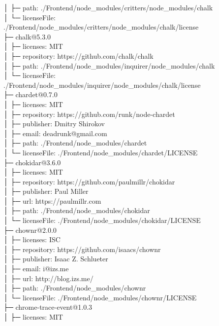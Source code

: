 \documentclass[
    paper=a4,
    twoside=false,
    parskip=half,
    listof=entryprefix,
    listof=totoc,
    index=totoc,
    bibliography=totoc,
    headsepline,
]{scrbook}
\begin{document}
    │  ├─ path: ./Frontend/node\_modules/critters/node\_modules/chalk\\
    │  └─ licenseFile: ./Frontend/node\_modules/critters/node\_modules/chalk/license\\
    ├─ chalk@5.3.0\\
    │  ├─ licenses: MIT\\
    │  ├─ repository: https://github.com/chalk/chalk\\
    │  ├─ path: ./Frontend/node\_modules/inquirer/node\_modules/chalk\\
    │  └─ licenseFile: ./Frontend/node\_modules/inquirer/node\_modules/chalk/license\\
    ├─ chardet@0.7.0\\
    │  ├─ licenses: MIT\\
    │  ├─ repository: https://github.com/runk/node-chardet\\
    │  ├─ publisher: Dmitry Shirokov\\
    │  ├─ email: deadrunk@gmail.com\\
    │  ├─ path: ./Frontend/node\_modules/chardet\\
    │  └─ licenseFile: ./Frontend/node\_modules/chardet/LICENSE\\
    ├─ chokidar@3.6.0\\
    │  ├─ licenses: MIT\\
    │  ├─ repository: https://github.com/paulmillr/chokidar\\
    │  ├─ publisher: Paul Miller\\
    │  ├─ url: https://paulmillr.com\\
    │  ├─ path: ./Frontend/node\_modules/chokidar\\
    │  └─ licenseFile: ./Frontend/node\_modules/chokidar/LICENSE\\
    ├─ chownr@2.0.0\\
    │  ├─ licenses: ISC\\
    │  ├─ repository: https://github.com/isaacs/chownr\\
    │  ├─ publisher: Isaac Z. Schlueter\\
    │  ├─ email: i@izs.me\\
    │  ├─ url: http://blog.izs.me/\\
    │  ├─ path: ./Frontend/node\_modules/chownr\\
    │  └─ licenseFile: ./Frontend/node\_modules/chownr/LICENSE\\
    ├─ chrome-trace-event@1.0.3\\
    │  ├─ licenses: MIT\\
\end{document}
